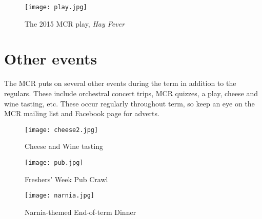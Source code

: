 \begin{figure}[htbp]
\centering
\texttt{[image: play.jpg]}
\caption[]{The 2015 MCR play,
\emph{Hay Fever}}
\label{fig:play}
\end{figure}

\section{Other events}
The MCR puts on several other events during the term in addition to the regulars. These include orchestral concert trips, MCR quizzes, a play, cheese and wine tasting, etc. These occur regularly throughout term, so keep an eye on the MCR mailing list and Facebook page for adverts.


\begin{figure}[htbp]
\centering
		\begin{minipage}{0.3\textwidth}
                \texttt{[image: cheese2.jpg]}
                \caption[]{Cheese and Wine tasting}
                \label{fig:cheese}
        \end{minipage}%
        \quad
        \begin{minipage}{0.3\textwidth}
                \texttt{[image: pub.jpg]}
                \caption[]{Freshers' Week Pub Crawl}
                \label{fig:crawl}
        \end{minipage}%
        \quad
        \begin{minipage}{0.30\textwidth}      
                \texttt{[image: narnia.jpg]}
                \caption[]{Narnia-themed End-of-term Dinner}
                \label{fig:narnia}
        \end{minipage}%
\end{figure}